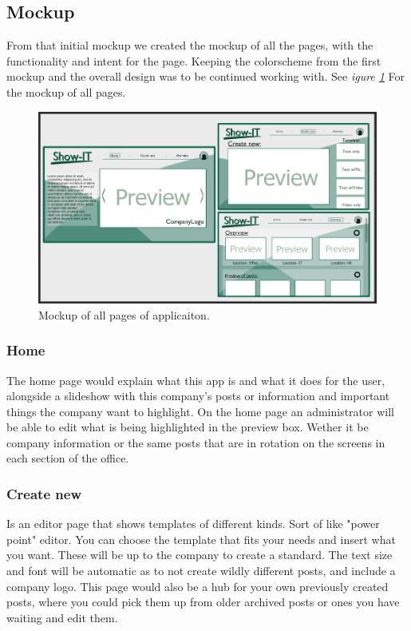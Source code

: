 \documentclass[12pt]{article}
\begin{document}
    \subsection{Mockup}
From that initial mockup we created the mockup of all the pages, with the functionality and intent for the page.
Keeping the colorscheme from the first mockup and the overall design was to be continued working with.
    See \textit {igure \ref{fig:MUA}} For the mockup of all pages.
\begin{figure} [!htbp]
    \includegraphics[scale=0.55]{mockup_all.png} 
        \caption{Mockup of all pages of applicaiton.}
    \label{fig:MUA}
\end{figure}

        \subsubsection{Home}
The home page would explain what this app is and what it does for the user, alongside a slideshow with this company's
posts or information and important things the company want to highlight.
On the home page an administrator will be able to edit what is being highlighted in the preview box. Wether it be 
company information or the same posts that are in rotation on the screens in each section of the office.

        \subsubsection{Create new}
Is an editor page that shows templates of different kinds. Sort of like "power point" editor. You can choose the template 
that fits your needs and insert what you want. These will be up to the company to create a standard. The text 
size and font will be automatic as to not create wildly different posts, and include a company logo.
This page would also be a hub for your own previously created posts, where you could pick them up from 
older archived posts or ones you have waiting and edit them.
\end{document}
